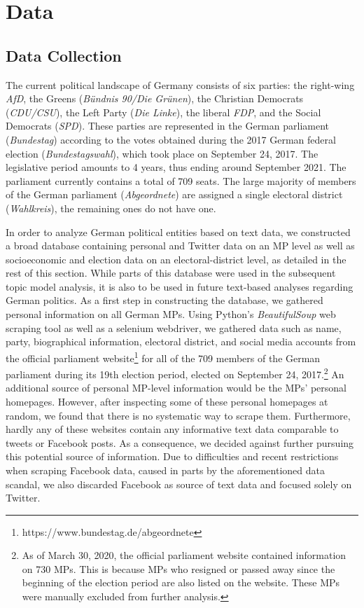 \section{Data}
\label{Data}

\subsection{Data Collection}
\label{Data Collection}

The current political landscape of Germany consists of six parties: the right-wing \textit{AfD}, the Greens (\textit{Bündnis 90/Die Grünen}), the Christian Democrats (\textit{CDU/CSU}), the Left Party (\textit{Die Linke}), the liberal \textit{FDP}, and the Social Democrats (\textit{SPD}). These parties are represented in the German parliament (\textit{Bundestag}) according to the votes obtained during the 2017 German federal election (\textit{Bundestagswahl}), which took place on September 24, 2017. The legislative period amounts to 4 years, thus ending around September 2021. The parliament currently contains a total of 709 seats. The large majority of members of the German parliament (\textit{Abgeordnete}) are assigned a single electoral district (\textit{Wahlkreis}), the remaining ones do not have one.

In order to analyze German political entities based on text data, we constructed a broad database containing personal and Twitter data on an MP level as well as socioeconomic and election data on an electoral-district level, as detailed in the rest of this section. While parts of this database were used in the subsequent topic model analysis, it is also to be used in future text-based analyses regarding German politics. As a first step in constructing the database, we gathered personal information on all German MPs. Using Python's \textit{BeautifulSoup} web scraping tool as well as a selenium webdriver, we gathered data such as name, party, biographical information, electoral district, and social media accounts from the official parliament website\footnote{https://www.bundestag.de/abgeordnete} for all of the 709 members of the German parliament during its 19th election period, elected on September 24, 2017.\footnote{As of March 30, 2020, the official parliament website contained information on 730 MPs. This is because MPs who resigned or passed away since the beginning of the election period are also listed on the website. These MPs were manually excluded from further analysis.} An additional source of personal MP-level information would be the MPs' personal homepages. However, after inspecting some of these personal homepages at random, we found that there is no systematic way to scrape them. Furthermore, hardly any of these websites contain any informative text data comparable to tweets or Facebook posts. As a consequence, we decided against further pursuing this potential source of information. Due to difficulties and recent restrictions when scraping Facebook data, caused in parts by the aforementioned data scandal, we also discarded Facebook as source of text data and focused solely on Twitter. 

